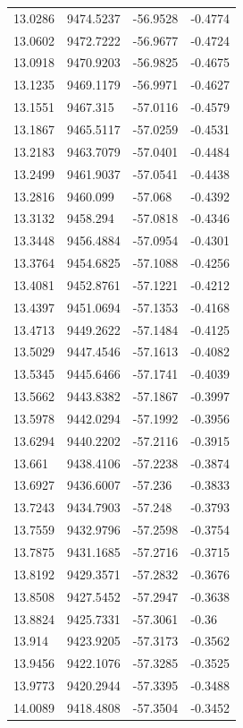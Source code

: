 \begin{table}[H]
\begin{tabular}{llll}
13.0286 & 9474.5237 & -56.9528 & -0.4774 \\
13.0602 & 9472.7222 & -56.9677 & -0.4724 \\
13.0918 & 9470.9203 & -56.9825 & -0.4675 \\
13.1235 & 9469.1179 & -56.9971 & -0.4627 \\
13.1551 & 9467.315 & -57.0116 & -0.4579 \\
13.1867 & 9465.5117 & -57.0259 & -0.4531 \\
13.2183 & 9463.7079 & -57.0401 & -0.4484 \\
13.2499 & 9461.9037 & -57.0541 & -0.4438 \\
13.2816 & 9460.099 & -57.068 & -0.4392 \\
13.3132 & 9458.294 & -57.0818 & -0.4346 \\
13.3448 & 9456.4884 & -57.0954 & -0.4301 \\
13.3764 & 9454.6825 & -57.1088 & -0.4256 \\
13.4081 & 9452.8761 & -57.1221 & -0.4212 \\
13.4397 & 9451.0694 & -57.1353 & -0.4168 \\
13.4713 & 9449.2622 & -57.1484 & -0.4125 \\
13.5029 & 9447.4546 & -57.1613 & -0.4082 \\
13.5345 & 9445.6466 & -57.1741 & -0.4039 \\
13.5662 & 9443.8382 & -57.1867 & -0.3997 \\
13.5978 & 9442.0294 & -57.1992 & -0.3956 \\
13.6294 & 9440.2202 & -57.2116 & -0.3915 \\
13.661 & 9438.4106 & -57.2238 & -0.3874 \\
13.6927 & 9436.6007 & -57.236 & -0.3833 \\
13.7243 & 9434.7903 & -57.248 & -0.3793 \\
13.7559 & 9432.9796 & -57.2598 & -0.3754 \\
13.7875 & 9431.1685 & -57.2716 & -0.3715 \\
13.8192 & 9429.3571 & -57.2832 & -0.3676 \\
13.8508 & 9427.5452 & -57.2947 & -0.3638 \\
13.8824 & 9425.7331 & -57.3061 & -0.36 \\
13.914 & 9423.9205 & -57.3173 & -0.3562 \\
13.9456 & 9422.1076 & -57.3285 & -0.3525 \\
13.9773 & 9420.2944 & -57.3395 & -0.3488 \\
14.0089 & 9418.4808 & -57.3504 & -0.3452 \\

\end{tabular}
\end{table}
